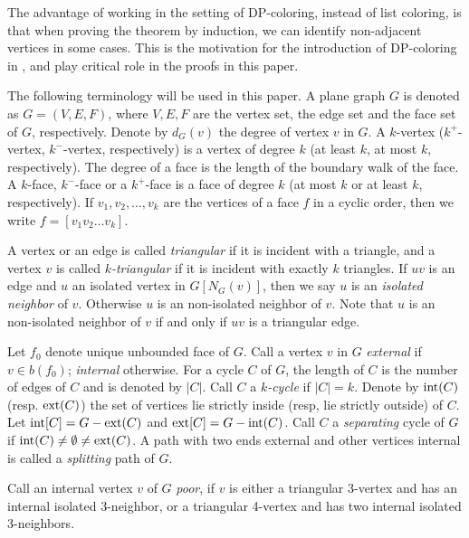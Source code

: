 \documentclass{article}
\begin{document}
The advantage of working in the setting of DP-coloring, instead of list coloring, is that when proving the theorem by induction, we can identify non-adjacent vertices in some cases. This is the motivation for the introduction of DP-coloring in \cite{dvovrak2018correspondence}, and play critical role in the proofs in this paper.  

The following terminology will be used in this paper. 
A plane graph $G$ is denoted as $G=(V,E,F)$, where $V,E,F$ are  the vertex set, the edge set and the face set of $G$, respectively. Denote by $d_G(v)$  the degree of vertex $v$ in $G$. A $k$-vertex ($k^{+}$-vertex, $k^{- }$-vertex, respectively) is a vertex of degree $k$ (at least $k$, at most $k$, respectively). The degree of a face is the length of the boundary walk of the face. A $k$-face, $k^{- }$-face or a $k^{+ }$-face is a face of degree $k$ (at most $k$ or at least $k$, respectively). If $v_1,v_2,\ldots,v_k$ are the vertices of a face $f$ in a cyclic order, then we write $f=[v_1v_2 \ldots v_k]$.

 A  vertex or an edge is called \textit{triangular} if it is incident with a triangle, and  a vertex $v$ is called \textit{$k$-triangular} if it is incident with exactly $k$ triangles. 
 If $uv$ is an edge and $u$ an isolated vertex in $G[N_G(v)]$, then we say $u$ is an \textit{isolated neighbor} of $v$.  Otherwise $u$ is an non-isolated neighbor of $v$. Note that $u$ is an non-isolated neighbor of $v$ if and only if $uv$ is a triangular edge. 


 Let $f_0$ denote unique unbounded face of $G$. Call a vertex $v$ in $G$ \textit{external} if $v\in b(f_0)$; \textit{internal} otherwise. For a cycle $C$ of $G$, the length of $C$ is the number of edges of $C$ and is denoted by $|C|$. Call $C$ a \textit{$k$-cycle} if $|C|=k$. Denote by ${\rm int}(C)$ (resp. ${\rm ext}(C)$) the set of   vertices lie strictly inside (resp, lie strictly outside) of $C$. Let ${\rm int}[C]=G-{\rm ext}(C)$ and ${\rm ext}[C]=G-{\rm int}(C)$. Call $C$ a \textit{separating} cycle of $G$ if ${\rm int}(C)\ne \emptyset  \ne {\rm ext}(C)$.  A path with  two ends  external and other vertices internal is called a \textit{splitting} path of $G$. 

 Call an internal vertex $v$ of $G$ \textit{poor}, if $v$ is either a triangular 3-vertex and has  an internal isolated 3-neighbor, or a triangular 4-vertex and has two internal isolated 3-neighbors.
\end{document}
